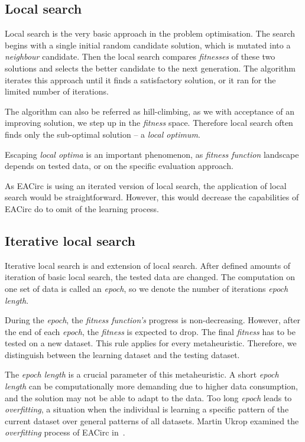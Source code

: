\documentclass[
    digital,    %
    oneside,    %
    color,
    11pt,
    nocover,
    notable,
    nolof,
    nolot,
]{fithesis3}
\begin{document}
\subsection{Local search}
\label{subsec:opt-single-sol-ls}

Local search is the very basic approach in the problem optimisation. The search begins with a single initial random candidate solution, which is mutated into a \textit{neighbour} candidate. Then the local search compares \textit{fitnesses} of these two solutions and selects the better candidate to the next generation. The algorithm iterates this approach until it finds a satisfactory solution, or it ran for the limited number of iterations.

The algorithm can also be referred as hill-climbing, as we with acceptance of an improving solution, we step up in the \textit{fitness} space. Therefore local search often finds only the sub-optimal solution -- a \textit{local optimum}.

Escaping \textit{local optima} is an important phenomenon, as \textit{fitness function} landscape depends on tested data, or on the specific evaluation approach.

As EACirc is using an iterated version of local search, the application of local search would be straightforward. However, this would decrease the capabilities of EACirc do to omit of the learning process.

\subsection{Iterative local search}
\label{subsec:opt-single-sol-ils}

Iterative local search is and extension of local search. After defined amounts of iteration of basic local search, the tested data are changed. The computation on one set of data is called an \textit{epoch}, so we denote the number of iterations \textit{epoch length}.

During the \textit{epoch}, the \textit{fitness function's} progress is non-decreasing. However, after the end of each \textit{epoch}, the \textit{fitness} is expected to drop. The final \textit{fitness} has to be tested on a new dataset. This rule applies for every metaheuristic. Therefore, we distinguish between the learning dataset and the testing dataset.

The \textit{epoch length} is a crucial parameter of this metaheuristic. A short \textit{epoch length} can be computationally more demanding due to higher data consumption, and the solution may not be able to adapt to the data. Too long \textit{epoch} leads to \textit{overfitting}, a situation when the individual is learning a specific pattern of the current dataset over general patterns of all datasets. Martin Ukrop examined the \textit{overfitting} process of EACirc in~\cite[Chapter~7]{ukropBcThesis}.
\end{document}

